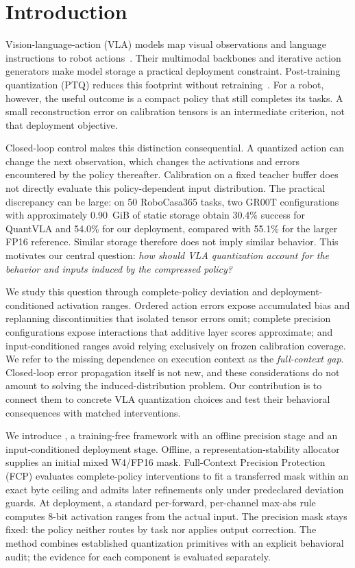 \section{Introduction}
\label{sec:introduction}

Vision-language-action (VLA) models map visual observations and language instructions to robot actions~\cite{brohan2023rt2,octo2024,kim2024openvla,black2024pi0,intelligence2025pi05,bjorck2025groot}. Their multimodal backbones and iterative action generators make model storage a practical deployment constraint. Post-training quantization (PTQ) reduces this footprint without retraining~\cite{xiao2023smoothquant,lin2024duquant}. For a robot, however, the useful outcome is a compact policy that still completes its tasks. A small reconstruction error on calibration tensors is an intermediate criterion, not that deployment objective.

Closed-loop control makes this distinction consequential. A quantized action can change the next observation, which changes the activations and errors encountered by the policy thereafter. Calibration on a fixed teacher buffer does not directly evaluate this policy-dependent input distribution. The practical discrepancy can be large: on 50 RoboCasa365 tasks, two GR00T configurations with approximately 0.90~GiB of static storage obtain 30.4\% success for QuantVLA and 54.0\% for our deployment, compared with 55.1\% for the larger FP16 reference. Similar storage therefore does not imply similar behavior. This motivates our central question: \emph{how should VLA quantization account for the behavior and inputs induced by the compressed policy?}

We study this question through complete-policy deviation and deployment-conditioned activation ranges. Ordered action errors expose accumulated bias and replanning discontinuities that isolated tensor errors omit; complete precision configurations expose interactions that additive layer scores approximate; and input-conditioned ranges avoid relying exclusively on frozen calibration coverage. We refer to the missing dependence on execution context as the \emph{full-context gap}. Closed-loop error propagation itself is not new, and these considerations do not amount to solving the induced-distribution problem. Our contribution is to connect them to concrete VLA quantization choices and test their behavioral consequences with matched interventions.

We introduce \method, a training-free framework with an offline precision stage and an input-conditioned deployment stage. Offline, a representation-stability allocator supplies an initial mixed W4/FP16 mask. Full-Context Precision Protection (FCP) evaluates complete-policy interventions to fit a transferred mask within an exact byte ceiling and admits later refinements only under predeclared deviation guards. At deployment, a standard per-forward, per-channel max-abs rule computes 8-bit activation ranges from the actual input. The precision mask stays fixed: the policy neither routes by task nor applies output correction. The method combines established quantization primitives with an explicit behavioral audit; the evidence for each component is evaluated separately.

